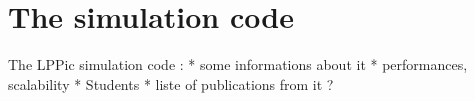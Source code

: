 

\section*{The \LPPic simulation code }
\label{sec-lppic}


The LPPic simulation code :
* some informations about it
* performances, scalability
* Students
* liste of publications from it ? 